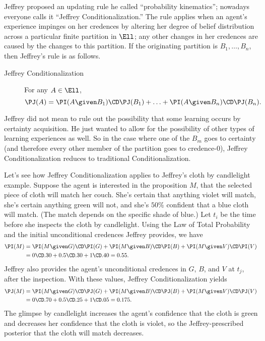 Jeffrey proposed an updating rule he called ``probability kinematics''; nowadays everyone calls it ``Jeffrey Conditionalization.'' The rule applies when an agent's experience impinges on her credences by altering her degree of belief distribution across a particular finite partition in $\Ell$; any other changes in her credences are caused by the changes to this partition. If the originating partition is $B_1, \ldots, B_n$, then Jeffrey's rule is as follows.
\begin{description}
\item[Jeffrey Conditionalization]{For any $A \in \Ell$, $$\PJ(A)=\PI(A \given B_1) \CD \PJ(B_1) + \ldots + \PI(A \given B_n) \CD \PJ(B_n).$$}
\end{description}
Jeffrey did not mean to rule out the possibility that some learning occurs by certainty acquisition. He just wanted to allow for the possibility of other types of learning experiences as well. So in the case where one of the $B_m$ goes to certainty (and therefore every other member of the partition goes to credence-$0$), Jeffrey Conditionalization reduces to traditional Conditionalization.

Let's see how Jeffrey Conditionalization applies to Jeffrey's cloth by candlelight example. Suppose the agent is interested in the proposition $M$, that the selected piece of cloth will match her couch.  She's certain that anything violet will match, she's certain anything green will not, and she's $50\%$ confident that a blue cloth will match. (The match depends on the specific shade of blue.) Let $t_i$ be the time before she inspects the cloth by candlelight. Using the Law of Total Probability and the initial unconditional credences Jeffrey provides, we have
\begin{equation}
\begin{split}
\PI(M) &= \PI(M \given G) \CD \PI(G) + \PI(M \given B) \CD \PI(B) + \PI(M \given V) \CD \PI(V) \\
		&= 0 \CD .30 + 0.5 \CD .30 + 1 \CD .40 = 0.55.
\end{split}
\end{equation}
Jeffrey also provides the agent's unconditional credences in $G$, $B$, and $V$ at $t_j$, after the inspection. With these values, Jeffrey Conditionalization yields
\begin{equation}
\begin{split}
\PJ(M) &= \PI(M \given G) \CD \PJ(G) + \PI(M \given B) \CD \PJ(B) + \PI(M \given V) \CD \PJ(V) \\
		&= 0 \CD .70 + 0.5 \CD .25 + 1 \CD .05 = 0.175.
\end{split}
\end{equation}
The glimpse by candlelight increases the agent's confidence that the cloth is green and decreases her confidence that the cloth is violet, so the Jeffrey-prescribed posterior that the cloth will match decreases.

